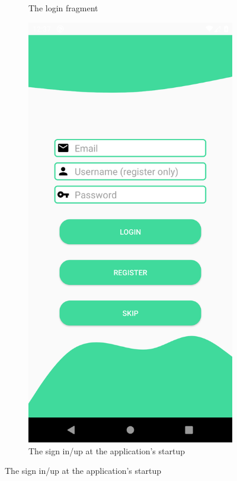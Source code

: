 \begin{figure}[H]
\begin{center}
\begin{subfigure}{.3\textwidth}
            \caption{The login fragment} 
        \end{subfigure}%
        \begin{subfigure}{.3\textwidth}
            \includegraphics[scale=0.1, width=\textwidth]{_figures/firstSign.png}
            \caption{The sign in/up at the application's startup} 
        \end{subfigure}%
    \end{center}
\end{figure}

